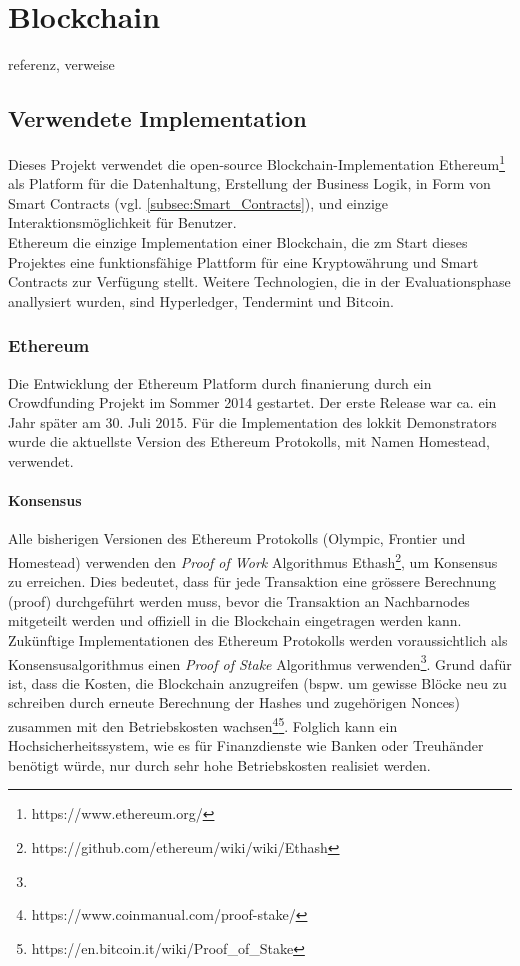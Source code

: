 \section{Blockchain}
\label{sec:Blockchain}
referenz, verweise

\subsection{Verwendete Implementation}
Dieses Projekt verwendet die open-source Blockchain-Implementation Ethereum\footnote{https://www.ethereum.org/} als Platform für die Datenhaltung, Erstellung der Business Logik, in Form von Smart Contracts (vgl. \ref{subsec:Smart_Contracts}), und einzige Interaktionsmöglichkeit für Benutzer.\\Ethereum die einzige Implementation einer Blockchain, die zm Start dieses Projektes eine funktionsfähige Plattform für eine Kryptowährung und Smart Contracts zur Verfügung stellt. Weitere Technologien, die in der Evaluationsphase anallysiert wurden, sind Hyperledger, Tendermint und Bitcoin.

\subsubsection{Ethereum}
Die Entwicklung der Ethereum Platform durch finanierung durch ein Crowdfunding Projekt im Sommer 2014 gestartet. Der erste Release war ca. ein Jahr später am 30. Juli 2015. Für die Implementation des lokkit Demonstrators wurde die aktuellste Version des Ethereum Protokolls, mit Namen Homestead, verwendet.
\paragraph{Konsensus}
Alle bisherigen Versionen des Ethereum Protokolls (Olympic, Frontier und Homestead) verwenden den \emph{Proof of Work} Algorithmus Ethash\footnote{https://github.com/ethereum/wiki/wiki/Ethash}, um Konsensus zu erreichen. Dies bedeutet, dass für jede Transaktion eine grössere Berechnung (proof) durchgeführt werden muss, bevor die Transaktion an Nachbarnodes mitgeteilt werden und offiziell in die Blockchain eingetragen werden kann. \\Zukünftige Implementationen des Ethereum Protokolls werden voraussichtlich als Konsensusalgorithmus einen \emph{Proof of Stake} Algorithmus verwenden\footnote{}. Grund dafür ist, dass die Kosten, die Blockchain anzugreifen (bspw. um gewisse Blöcke neu zu schreiben durch erneute Berechnung der Hashes und zugehörigen Nonces) zusammen mit den Betriebskosten wachsen\footnote{https://www.coinmanual.com/proof-stake/}\footnote{https://en.bitcoin.it/wiki/Proof_of_Stake}. Folglich kann ein Hochsicherheitssystem, wie es für Finanzdienste wie Banken oder Treuhänder benötigt würde, nur durch sehr hohe Betriebskosten realisiet werden.

